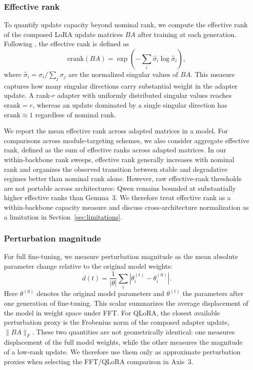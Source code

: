 \documentclass[a4paper,fleqn]{cas-dc}
\newif\ifshowchanges
\newcommand{\rev}[1]{\ifshowchanges{\color{blue}#1}\else{#1}\fi}
\begin{document}
\subsubsection{Effective rank}\label{sec:erank}
To quantify update capacity beyond nominal rank, we compute the effective rank
of the composed LoRA update matrices $BA$ after training at each generation.
Following \citet{roy2007}, the effective rank is defined as
\begin{equation}\label{eq:erank}
    \mathrm{erank}(BA) =
    \exp\!\left(-\sum_i \hat{\sigma}_i \log \hat{\sigma}_i\right),
\end{equation}
where $\hat{\sigma}_i = \sigma_i / \sum_j \sigma_j$ are the normalized singular
values of $BA$. This measure captures how many singular directions carry
substantial weight in the adapter update. A rank-$r$ adapter with uniformly
distributed singular values reaches $\mathrm{erank}=r$, whereas an update
dominated by a single singular direction has $\mathrm{erank}\approx 1$ regardless
of nominal rank.

We report the mean effective rank across adapted
matrices in a model. For comparisons across module-targeting schemes, we also
consider aggregate effective rank, defined as the sum of effective ranks across
adapted matrices. In our within-backbone rank sweeps, effective rank generally
increases with nominal rank and organizes the observed transition between
stable and degradative regimes better than nominal rank alone. However,
raw effective-rank thresholds are not portable across architectures: Qwen
remains bounded at substantially higher effective ranks than Gemma~3. We
therefore treat effective rank as a within-backbone capacity measure and discuss
cross-architecture normalization as a limitation in Section~\ref{sec:limitations}.

\subsubsection{Perturbation magnitude}\label{sec:pertmag}
For full fine-tuning, we measure perturbation magnitude as the mean absolute
parameter change relative to the original model weights:
\begin{equation}\label{eq:drift}
    \rev{d(t)} =
    \frac{1}{|\theta|}\sum_i |\theta^{(t)}_i - \theta^{(0)}_i|.
\end{equation}
Here $\theta^{(0)}$ denotes the original model parameters and $\theta^{(t)}$
the parameters after one generation of fine-tuning.
This scalar summarizes the
average displacement of the model in weight space under FFT. For QLoRA, the
closest available perturbation proxy is the Frobenius norm of the composed
adapter update, $\|BA\|_F$. These two quantities are not geometrically identical:
one measures displacement of the full model weights, while the other measures
the magnitude of a low-rank update. We therefore use them only as approximate
perturbation proxies when selecting the FFT/QLoRA comparison in Axis~3.
\end{document}
